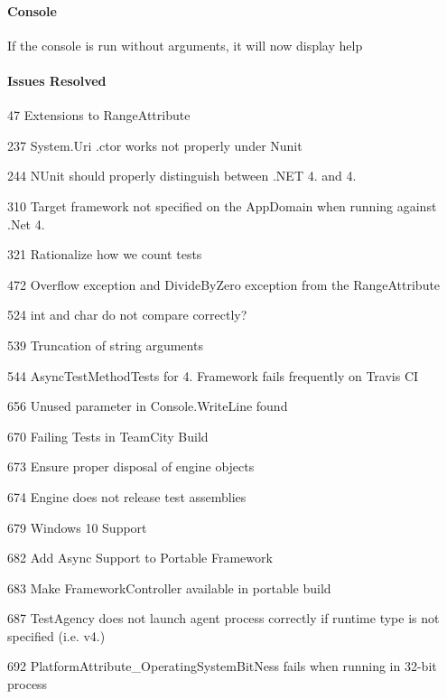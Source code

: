 \paragraph*{Console}


\begin{DoxyItemize}
\item If the console is run without arguments, it will now display help
\end{DoxyItemize}

\paragraph*{Issues Resolved}


\begin{DoxyItemize}
\item 47 Extensions to Range\+Attribute
\item 237 System.\+Uri .ctor works not properly under Nunit
\item 244 N\+Unit should properly distinguish between .N\+ET 4. and 4.
\item 310 Target framework not specified on the App\+Domain when running against .Net 4.
\item 321 Rationalize how we count tests
\item 472 Overflow exception and Divide\+By\+Zero exception from the Range\+Attribute
\item 524 int and char do not compare correctly?
\item 539 Truncation of string arguments
\item 544 Async\+Test\+Method\+Tests for 4. Framework fails frequently on Travis CI
\item 656 Unused parameter in Console.\+Write\+Line found
\item 670 Failing Tests in Team\+City Build
\item 673 Ensure proper disposal of engine objects
\item 674 Engine does not release test assemblies
\item 679 Windows 10 Support
\item 682 Add Async Support to Portable Framework
\item 683 Make Framework\+Controller available in portable build
\item 687 Test\+Agency does not launch agent process correctly if runtime type is not specified (i.\+e. v4.)
\item 692 Platform\+Attribute\+\_\+\+Operating\+System\+Bit\+Ness fails when running in 32-\/bit process

\end{DoxyItemize}

